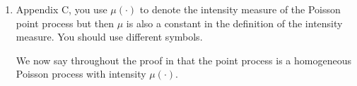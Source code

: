 \documentclass[11pt]{article}
\begin{document}
\begin{enumerate}[1.]
  \item Appendix C, you use $\mu(\cdot)$ to denote the intensity measure of the Poisson point process but then $\mu$ is also a constant in the definition of the intensity measure. You should use different symbols. \\

  \begin{response}
    We now say throughout the proof in  that the point process is a homogeneous Poisson process with intensity $\mu(\cdot)$.
  \end{response}
\end{enumerate}



\end{document}
